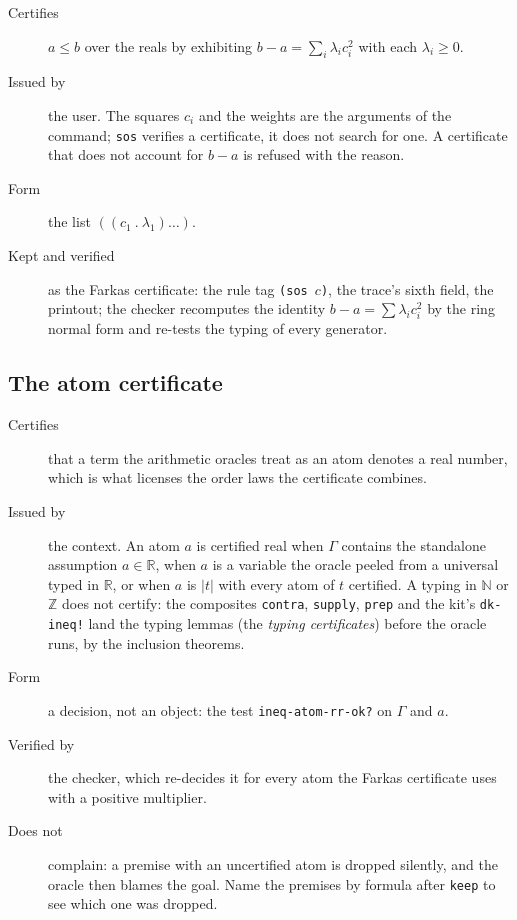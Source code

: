 \begin{description}
\item[Certifies] $a \le b$ over the reals by exhibiting
  $b - a = \sum_i \lambda_i c_i^2$ with each $\lambda_i \ge 0$.
\item[Issued by] the user.  The squares $c_i$ and the weights are the
  arguments of the command; \texttt{sos} verifies a certificate, it does
  not search for one.  A certificate that does not account for $b - a$ is
  refused with the reason.
\item[Form] the list $((c_1\ .\ \lambda_1) \ldots)$.
\item[Kept and verified] as the Farkas certificate: the rule tag
  \texttt{(sos $c$)}, the trace's sixth field, the printout; the checker
  recomputes the identity $b - a = \sum \lambda_i c_i^2$ by the ring
  normal form and re-tests the typing of every generator.
\end{description}

\subsection{The atom certificate}

\begin{description}
\item[Certifies] that a term the arithmetic oracles treat as an atom
  denotes a real number, which is what licenses the order laws the
  certificate combines.
\item[Issued by] the context.  An atom $a$ is certified real when
  $\Gamma$ contains the standalone assumption $a \in \mathbb{R}$, when $a$
  is a variable the oracle peeled from a universal typed in $\mathbb{R}$,
  or when $a$ is $|t|$ with every atom of $t$ certified.  A typing in
  $\mathbb{N}$ or $\mathbb{Z}$ does not certify: the composites
  \texttt{contra}, \texttt{supply}, \texttt{prep} and the kit's
  \texttt{dk-ineq!} land the typing lemmas (the \emph{typing
  certificates}) before the oracle runs, by the inclusion theorems.
\item[Form] a decision, not an object: the test
  \texttt{ineq-atom-rr-ok?} on $\Gamma$ and $a$.
\item[Verified by] the checker, which re-decides it for every atom the
  Farkas certificate uses with a positive multiplier.
\item[Does not] complain: a premise with an uncertified atom is dropped
  silently, and the oracle then blames the goal.  Name the premises by
  formula after \texttt{keep} to see which one was dropped.
\end{description}

